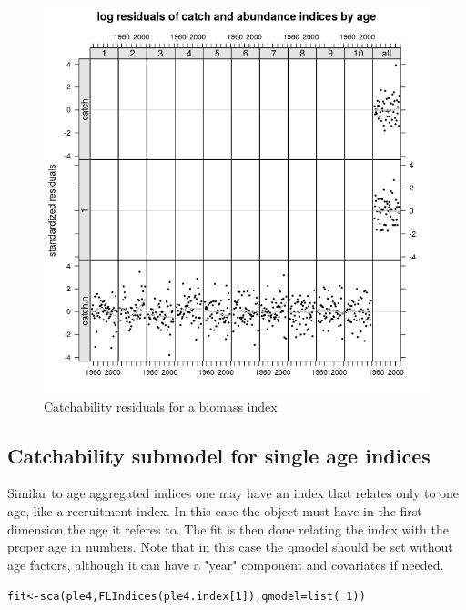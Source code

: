 \documentclass[a4paper,english,10pt]{article}\usepackage[]{graphicx}\usepackage[]{color}
\makeatletter
\newcommand{\hlnum}[1]{\textcolor[rgb]{0.063,0.58,0.627}{#1}}%
\newcommand{\hlopt}[1]{\textcolor[rgb]{0.196,0.196,0.196}{#1}}%
\newcommand{\hlstd}[1]{\textcolor[rgb]{0.196,0.196,0.196}{#1}}%
\newcommand{\hlkwb}[1]{\textcolor[rgb]{0.627,0,0.314}{#1}}%
\newcommand{\hlkwc}[1]{\textcolor[rgb]{0,0.631,0.314}{#1}}%
\newcommand{\hlkwd}[1]{\textcolor[rgb]{0.78,0.227,0.412}{#1}}%
\newenvironment{kframe}{%
 \def\at@end@of@kframe{}%
 \ifinner\ifhmode%
  \def\at@end@of@kframe{\end{minipage}}%
  \begin{minipage}{\columnwidth}%
 \fi\fi%
 \def\FrameCommand##1{\hskip\@totalleftmargin \hskip-\fboxsep
 \colorbox{shadecolor}{##1}\hskip-\fboxsep
     \hskip-\linewidth \hskip-\@totalleftmargin \hskip\columnwidth}%
 \MakeFramed {\advance\hsize-\width
   \@totalleftmargin\z@ \linewidth\hsize
   \@setminipage}}%
 {\par\unskip\endMakeFramed%
 \at@end@of@kframe}
\newenvironment{knitrout}{}{} %
\makeatother
\begin{document}
\begin{knitrout}
\color{fgcolor}\begin{figure}[H]

{\centering \includegraphics[width=.9\linewidth]{figure/resbio2-1} 

}

\caption[Catchability residuals for a biomass index]{Catchability residuals for a biomass index}\label{fig:resbio2}
\end{figure}


\end{knitrout}

\subsection{Catchability submodel for single age indices}

Similar to age aggregated indices one may have an index that relates only to one age, like a recruitment index. In this case the  object must have in the first dimension the age it referes to. The fit is then done relating the index with the proper age in numbers. Note that in this case the qmodel should be set without age factors, although it can have a "year" component and covariates if needed.

\begin{knitrout}
\color{fgcolor}\begin{kframe}
\begin{alltt}
\hlstd{fit} \hlkwb{<-} \hlkwd{sca}\hlstd{(ple4,} \hlkwd{FLIndices}\hlstd{(ple4.index[}\hlnum{1}\hlstd{]),} \hlkwc{qmodel} \hlstd{=} \hlkwd{list}\hlstd{(}\hlopt{~}\hlnum{1}\hlstd{))}
\end{alltt}
\end{kframe}
\end{knitrout}
\end{document}

